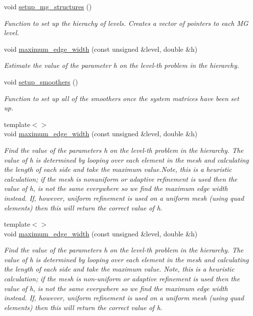 \begin{DoxyCompactItemize}
void \hyperlink{classoomph_1_1HelmholtzMGPreconditioner_a4285eee67bbf57ae00ca2aada2744743}{setup\+\_\+mg\+\_\+structures} ()
\begin{DoxyCompactList}\small\item\em Function to set up the hierachy of levels. Creates a vector of pointers to each MG level. \end{DoxyCompactList}\item 
void \hyperlink{classoomph_1_1HelmholtzMGPreconditioner_aaf65774e7e6c81e4960fcb451e7434e6}{maximum\+\_\+edge\+\_\+width} (const unsigned \&level, double \&h)
\begin{DoxyCompactList}\small\item\em Estimate the value of the parameter h on the level-\/th problem in the hierarchy. \end{DoxyCompactList}\item 
void \hyperlink{classoomph_1_1HelmholtzMGPreconditioner_a8e6345b2fd41602dd6a91e9bcecf718c}{setup\+\_\+smoothers} ()
\begin{DoxyCompactList}\small\item\em Function to set up all of the smoothers once the system matrices have been set up. \end{DoxyCompactList}\item 
{\footnotesize template$<$$>$ }\\void \hyperlink{classoomph_1_1HelmholtzMGPreconditioner_a6d82759a65c164c8ee020ea141c5d89e}{maximum\+\_\+edge\+\_\+width} (const unsigned \&level, double \&h)
\begin{DoxyCompactList}\small\item\em Find the value of the parameters h on the level-\/th problem in the hierarchy. The value of h is determined by looping over each element in the mesh and calculating the length of each side and take the maximum value.\+Note, this is a heuristic calculation; if the mesh is nonuniform or adaptive refinement is used then the value of h, is not the same everywhere so we find the maximum edge width instead. If, however, uniform refinement is used on a uniform mesh (using quad elements) then this will return the correct value of h. \end{DoxyCompactList}\item 
{\footnotesize template$<$$>$ }\\void \hyperlink{classoomph_1_1HelmholtzMGPreconditioner_a3c0766a4b1fa277a41c5ddc5a7391dd2}{maximum\+\_\+edge\+\_\+width} (const unsigned \&level, double \&h)
\begin{DoxyCompactList}\small\item\em Find the value of the parameters h on the level-\/th problem in the hierarchy. The value of h is determined by looping over each element in the mesh and calculating the length of each side and take the maximum value. Note, this is a heuristic calculation; if the mesh is non-\/uniform or adaptive refinement is used then the value of h, is not the same everywhere so we find the maximum edge width instead. If, however, uniform refinement is used on a uniform mesh (using quad elements) then this will return the correct value of h. \end{DoxyCompactList}\end{DoxyCompactItemize}
